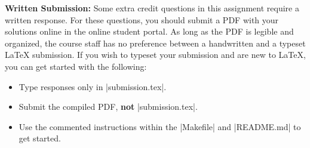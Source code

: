 {\bf Written Submission:}
Some extra credit questions in this assignment require a written response.  For these questions, you should submit a PDF
with your solutions online in the online student portal. As long as the PDF is legible and organized, the course
staff has no preference between a handwritten and a typeset \LaTeX{} submission.
If you wish to typeset your submission and are new to \LaTeX{}, you can get started with the following:
\begin{itemize}
  \item Type responses only in |submission.tex|.
  \item Submit the compiled PDF, {\bf not} |submission.tex|.
  \item Use the commented instructions within the |Makefile| and |README.md| to
  get started.
\end{itemize}